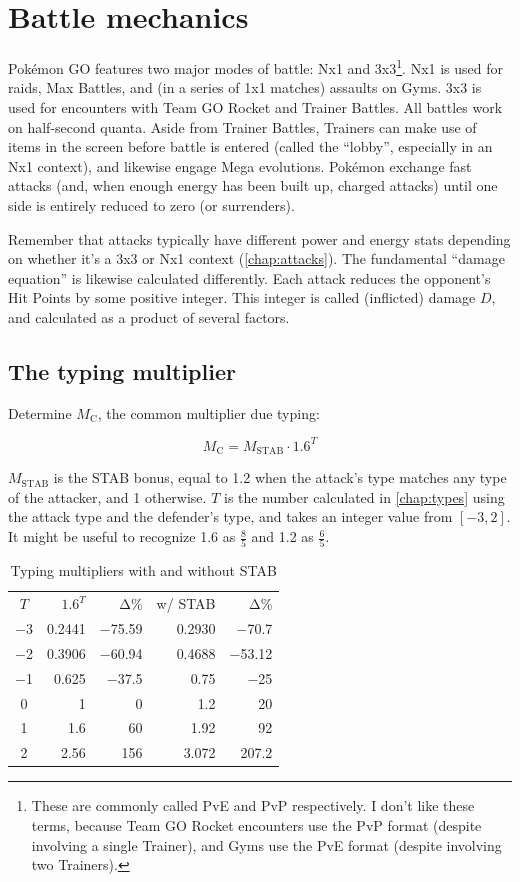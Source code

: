 \chapter{Battle mechanics\label{chap:battle}}
\nopagecolor
Pokémon GO features two major modes of battle: Nx1 and 3x3\footnote{These are commonly called PvE and PvP
 respectively. I don't like these terms, because Team GO Rocket encounters use the PvP format (despite involving
 a single Trainer), and Gyms use the PvE format (despite involving two Trainers).}.
Nx1 is used for raids, Max Battles, and (in a series of 1x1 matches) assaults on Gyms.
3x3 is used for encounters with Team GO Rocket and Trainer Battles.
All battles work on half-second quanta.
Aside from Trainer Battles, Trainers can make use of items in the screen before
  battle is entered (called the ``lobby'', especially in an Nx1 context), and
  likewise engage Mega evolutions.
Pokémon exchange fast attacks (and, when enough energy has been built up, charged attacks)
  until one side is entirely reduced to zero \HP{} (or surrenders).

Remember that attacks typically have different power and energy stats depending on
  whether it's a 3x3 or Nx1 context (\autoref{chap:attacks}).
The fundamental ``damage equation'' is likewise calculated differently.
Each attack reduces the opponent's Hit Points by some positive integer.
This integer is called (inflicted) damage $D$, and calculated as a product of several factors.

\section{The typing multiplier\label{sec:typemult}}
Determine $M_\mathrm{C}$, the common multiplier due typing:

\[ M_\mathrm{C} = M_\mathrm{STAB} \cdot 1.6^{T} \]

$M_\mathrm{STAB}$ is the STAB bonus, equal to 1.2 when the attack's type matches any
  type of the attacker, and 1 otherwise.
$T$ is the number calculated in \autoref{chap:types} using the attack type
 and the defender's type, and takes an integer value from $[−3, 2]$.
It might be useful to recognize 1.6 as $\frac{8}{5}$ and 1.2 as $\frac{6}{5}$.

\begin{table}
\centering
\begin{tabular}{c r r r r}
  $T$ & $1.6^{T}$ & Δ\% & w/ STAB & Δ\% \\
\Midrule
−3 & 0.2441 & −75.59 & 0.2930 & −70.7 \\
−2 & 0.3906 & −60.94 & 0.4688 & −53.12 \\
−1 & 0.625  & −37.5  & 0.75 & −25 \\
 0 & 1      & 0      & 1.2 & 20 \\
 1 & 1.6    & 60     & 1.92 & 92 \\
 2 & 2.56   & 156    & 3.072 & 207.2 \\
\end{tabular}
\caption{Typing multipliers with and without STAB\label{table:typemult}}
\end{table}

